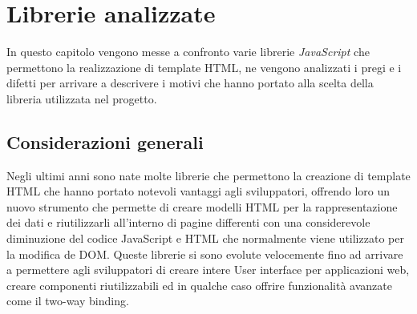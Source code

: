 
\chapter{Librerie analizzate}
\label{cap:librerie-analizzate}
In questo capitolo vengono messe a confronto varie librerie \textit{JavaScript} che permettono la realizzazione di template HTML, ne vengono analizzati i pregi e i difetti per arrivare a descrivere i motivi che hanno portato alla scelta della libreria utilizzata nel progetto.

\section{Considerazioni generali}
Negli ultimi anni sono nate molte librerie che permettono la creazione di template HTML che hanno portato notevoli vantaggi agli sviluppatori, offrendo loro un nuovo strumento che permette di creare modelli HTML per la rappresentazione dei dati e riutilizzarli all'interno di pagine differenti con una considerevole diminuzione del codice JavaScript e HTML che normalmente viene utilizzato per la modifica de DOM.
Queste librerie si sono evolute velocemente fino ad arrivare a permettere agli sviluppatori di creare intere User interface per applicazioni web, creare componenti riutilizzabili ed in qualche caso offrire funzionalità avanzate come il two-way binding.

